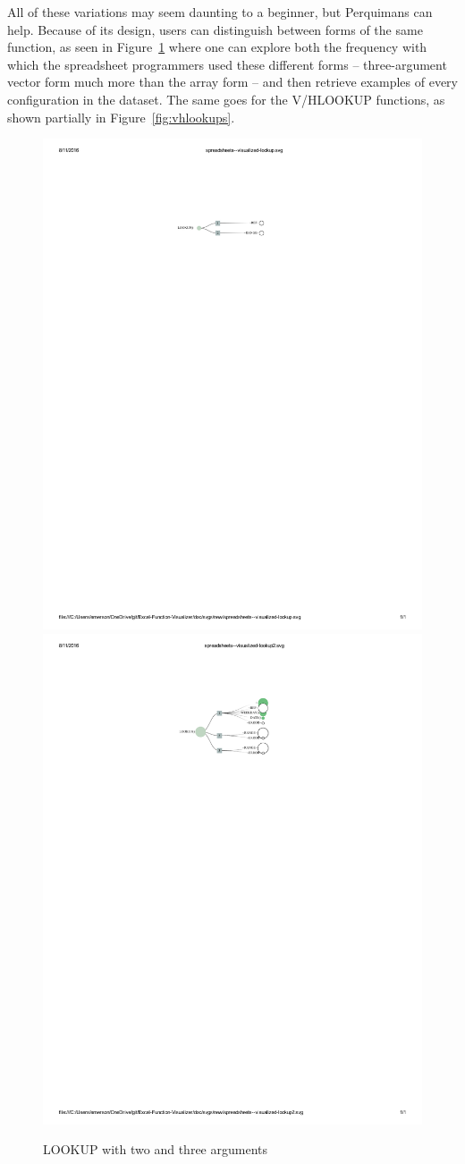 \documentclass[conference]{IEEEtran}
\newcommand{\toolname}{Perquimans } \newcommand{\toolnameend}{Perquimans}
\begin{document}
	All of these variations may seem daunting to a beginner, but \toolname can
	help. Because of its design, users can distinguish between forms of the same
	function, as seen in Figure~\ref{fig:lookups} where one can explore both the
	frequency with which the spreadsheet programmers used these different forms --
	three-argument vector form much more than the array form -- and then retrieve
	examples of every configuration in the dataset. The same goes for the V/HLOOKUP
	functions, as shown partially in Figure~\ref{fig:vhlookups}.
	
	\begin{figure}[h] \centering \includegraphics[width=.5\textwidth]{lookup-2}
		\includegraphics[width=.5\textwidth]{lookup-3} \caption{LOOKUP with two and
			three arguments}  \label{fig:lookups} \end{figure}
	
\end{document}

